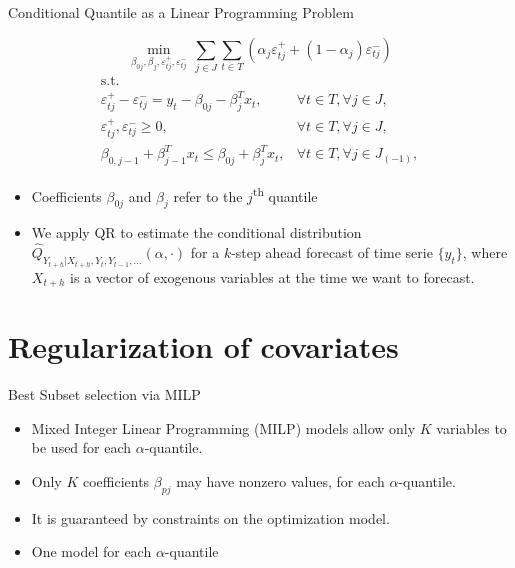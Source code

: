 \begin{frame}{Conditional Quantile as a Linear Programming Problem}

\[
\min_{\beta_{0j},\beta_j,\varepsilon_{tj}^{+}, \varepsilon_{tj}^{-}} \, \sum_{j \in J} \sum_{t \in T}\left(\alpha_j \varepsilon_{t j}^{+}+(1-\alpha_j)\varepsilon_{t j}^{-}\right)
\] \[
\begin{array}{lr}
\text{s.t.} &\\
\varepsilon_{t j}^{+}-\varepsilon_{t j}^{-}=y_{t} - \beta_{0j} - \beta_{j}^T x_{t}, & \forall t \in T, \forall j \in J, \\
\varepsilon_{tj}^+,\varepsilon_{tj}^- \geq 0, & \forall t \in T,\forall j \in J,\\
\beta_{0,j-1} + \beta_{j-1}^T x_{t} \leq \beta_{0j} + \beta_{j}^T x_{t},
& \forall t \in T, \forall j \in J_{(-1)},
\end{array}
\]

\begin{itemize}
\item
  Coefficients \(\beta_{0j}\) and \(\beta_j\) refer to the
  \(j\)\textsuperscript{th} quantile
\item
  We apply QR to estimate the conditional distribution
  \(\hat{Q}_{Y_{t+h}|X_{t+h},Y_t, Y_{t-1}, \dots} (\alpha,\cdot)\) for a
  \(k\)-step ahead forecast of time serie \(\{y_t\}\), where \(X_{t+h}\)
  is a vector of exogenous variables at the time we want to forecast.
\end{itemize}

\end{frame}

\section{Regularization of
covariates}\label{regularization-of-covariates}

\begin{frame}{Best Subset selection via MILP}

\begin{itemize}
\tightlist
\item
  Mixed Integer Linear Programming (MILP) models allow only \(K\)
  variables to be used for each \(\alpha\)-quantile.
\item
  Only \(K\) coefficients \(\beta_{pj}\) may have nonzero values, for
  each \(\alpha\)-quantile.
\item
  It is guaranteed by constraints on the optimization model.
\item
  One model for each \(\alpha\)-quantile
\end{itemize}

\end{frame}

